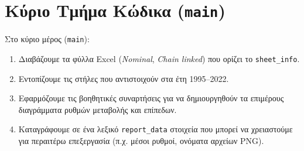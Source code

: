 \documentclass{book}
\begin{document}
\section{Κύριο Τμήμα Κώδικα (\texttt{main})}
Στο κύριο μέρος (\texttt{main}):
\begin{enumerate}
    \item Διαβάζουμε τα φύλλα Excel (\emph{Nominal}, \emph{Chain linked}) που ορίζει το \texttt{sheet\_info}.
    \item Εντοπίζουμε τις στήλες που αντιστοιχούν στα έτη 1995–2022.
    \item Εφαρμόζουμε τις βοηθητικές συναρτήσεις για να δημιουργηθούν τα επιμέρους διαγράμματα ρυθμών μεταβολής και επίπεδων.
    \item Καταγράφουμε σε ένα λεξικό \texttt{report\_data} στοιχεία που μπορεί να χρειαστούμε για περαιτέρω επεξεργασία (π.χ. μέσοι ρυθμοί, ονόματα αρχείων PNG).
\end{enumerate}
\end{document}
